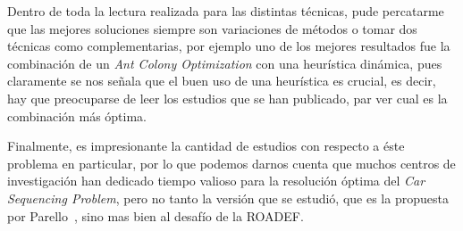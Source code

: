 Dentro de toda la lectura realizada para las distintas técnicas, pude percatarme que las mejores soluciones
siempre son variaciones de métodos o tomar dos técnicas como complementarias, por ejemplo uno de los
mejores resultados fue la combinación de un \emph{Ant Colony Optimization} con una heurística dinámica,
pues claramente se nos señala que el buen uso de una heurística es crucial, es decir, hay que preocuparse
de leer los estudios que se han publicado, par ver cual es la combinación más óptima.

Finalmente, es impresionante la cantidad de estudios con respecto a éste problema en particular,
por lo que podemos darnos cuenta que muchos centros de investigación han dedicado tiempo valioso
para la resolución óptima del \emph{Car Sequencing Problem}, pero no tanto la versión que se estudió,
que es la propuesta por Parello~\cite{parello}, sino mas bien al desafío de la ROADEF.
